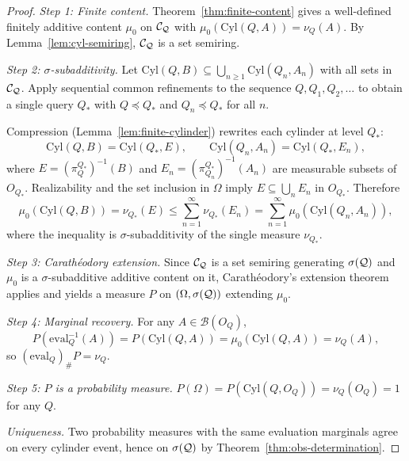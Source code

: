 \begin{proof}
\textit{Step 1: Finite content.}
Theorem~\ref{thm:finite-content} gives a well-defined finitely additive
content $\mu_0$ on $\mathcal{C}_{\mathcal{Q}}$ with $\mu_0(\mathrm{Cyl}(Q,A))=\nu_Q(A)$.
By Lemma~\ref{lem:cyl-semiring}, $\mathcal{C}_{\mathcal{Q}}$ is a set semiring.

\medskip
\noindent\textit{Step 2: $\sigma$-subadditivity.}
Let $\mathrm{Cyl}(Q,B)\subseteq\bigcup_{n\ge1}\mathrm{Cyl}(Q_n,A_n)$ with all
sets in $\mathcal{C}_{\mathcal{Q}}$.  Apply sequential common refinements to the
sequence $Q,Q_1,Q_2,\ldots$ to obtain a single query $Q_*$ with
$Q\preceq Q_*$ and $Q_n\preceq Q_*$ for all $n$.

Compression (Lemma~\ref{lem:finite-cylinder}) rewrites each cylinder
at level $Q_*$:
\[
\mathrm{Cyl}(Q,B) = \mathrm{Cyl}(Q_*,E),
\qquad
\mathrm{Cyl}(Q_n,A_n) = \mathrm{Cyl}(Q_*,E_n),
\]
where $E=(\pi^{Q_*}_Q)^{-1}(B)$ and $E_n=(\pi^{Q_*}_{Q_n})^{-1}(A_n)$
are measurable subsets of $O_{Q_*}$.
Realizability and the set inclusion in $\Omega$ imply $E\subseteq\bigcup_n E_n$ in $O_{Q_*}$.
Therefore
\[
\mu_0(\mathrm{Cyl}(Q,B))
= \nu_{Q_*}(E)
\le \sum_{n=1}^\infty \nu_{Q_*}(E_n)
= \sum_{n=1}^\infty \mu_0(\mathrm{Cyl}(Q_n,A_n)),
\]
where the inequality is $\sigma$-subadditivity of the single measure $\nu_{Q_*}$.

\medskip
\noindent\textit{Step 3: Carathéodory extension.}
Since $\mathcal{C}_{\mathcal{Q}}$ is a set semiring generating $\sigma(\mathcal{Q})$ and
$\mu_0$ is a $\sigma$-subadditive additive content on it,
Carathéodory's extension theorem~\cite{Billingsley,Bogachev} applies
and yields a measure $P$ on $(\Omega,\sigma(\mathcal{Q}))$ extending $\mu_0$.

\medskip
\noindent\textit{Step 4: Marginal recovery.}
For any $A\in\mathcal B(O_Q)$,
\[
P(\mathrm{eval}_Q^{-1}(A))
= P(\mathrm{Cyl}(Q,A))
= \mu_0(\mathrm{Cyl}(Q,A))
= \nu_Q(A),
\]
so $(\mathrm{eval}_Q)_\# P = \nu_Q$.

\medskip
\noindent\textit{Step 5: $P$ is a probability measure.}
$P(\Omega)=P(\mathrm{Cyl}(Q,O_Q))=\nu_Q(O_Q)=1$ for any $Q$.

\medskip
\noindent\textit{Uniqueness.}
Two probability measures with the same evaluation marginals agree on
every cylinder event, hence on $\sigma(\mathcal{Q})$ by
Theorem~\ref{thm:obs-determination}.
\end{proof}

